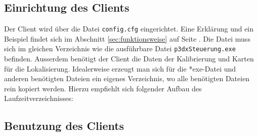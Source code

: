 \subsection{Einrichtung des Clients}%
\label{sec:einrichtung-client}
Der Client wird über die Datei \verb|config.cfg| eingerichtet. Eine
Erklärung und ein Beispiel findet sich im Abschnitt
\ref{sec:funktionsweise} auf Seite \pageref{config_aufbau}. Die Datei
muss sich im gleichen Verzeichnis wie die ausführbare Datei
\verb|p3dxSteuerung.exe| befinden. Ausserdem benötigt der Client die
Daten der Kalibrierung und Karten für die Lokalisierung. Idealerweise
erzeugt man sich für die *exe-Datei und anderen benötigten Dateien ein
eigenes Verzeichnis, wo alle benötigten Dateien rein kopiert werden.  Hierzu
empfiehlt sich folgender Aufbau des Laufzeitverzeichnisses: 

\subsection{Benutzung des Clients}
\label{sec:benutz-des-clients}
